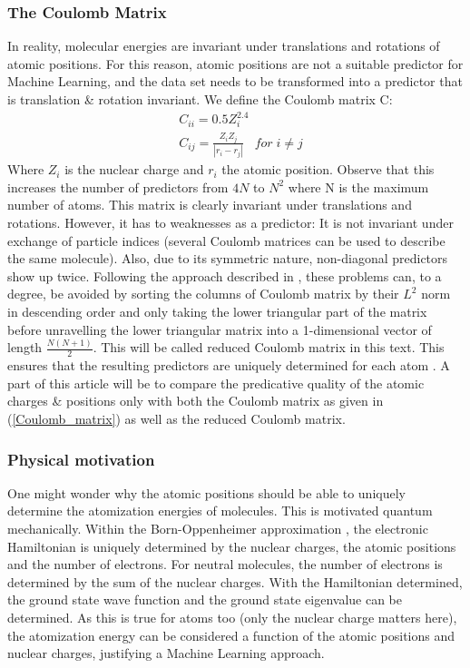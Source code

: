 \documentclass[11pt,a4paper,notitlepage]{article}
\begin{document}
\subsubsection{The Coulomb Matrix}
In reality, molecular energies are invariant under translations and rotations of atomic positions. For this reason, atomic positions are not a suitable predictor for Machine Learning, and the data set needs to be transformed into a predictor that is translation \& rotation invariant. We define the Coulomb matrix C:
\begin{equation}\label{Coulomb_matrix}
\begin{split}
    & C_{ii}=0.5Z_i^{2.4}\\
    & C_{ij}=\frac{Z_iZ_j}{|r_i-r_j|}\;\;\; for\; i\neq j
\end{split}
\end{equation}
Where $Z_i$ is the nuclear charge and $r_i$ the atomic position. Observe that this increases the number of predictors from $4N$ to $N^2$ where N is the maximum number of atoms. This matrix is clearly invariant under translations and rotations. However, it has to weaknesses as a predictor: It is not invariant under exchange of particle indices (several Coulomb matrices can be used to describe the same molecule). Also, due to its symmetric nature, non-diagonal predictors show up twice. Following the approach described in \citep{Atomization_network}, these problems can, to a degree, be avoided by sorting the columns of Coulomb matrix by their $L^2$ norm in descending order and only taking the lower triangular part of the matrix before unravelling the lower triangular matrix into a 1-dimensional vector of length $\frac{N(N+1)}{2}$. This will be called reduced Coulomb matrix in this text. This ensures that the resulting predictors are uniquely determined for each atom \citep{Atomization_Ridge}. A part of this article will be to compare the predicative quality of the atomic charges \& positions only with both the Coulomb matrix as given in (\ref{Coulomb_matrix}) as well as the reduced Coulomb matrix.
\subsubsection{Physical motivation}
One might wonder why the atomic positions should be able to uniquely determine the atomization energies of molecules. This is motivated quantum mechanically. Within the Born-Oppenheimer approximation \citep{szabo}, the electronic Hamiltonian is uniquely determined by the nuclear charges, the atomic positions and the number of electrons. For neutral molecules, the number of electrons is determined by the sum of the nuclear charges. With the Hamiltonian determined, the ground state wave function and the ground state eigenvalue can be determined. As this is true for atoms too (only the nuclear charge matters here), the atomization energy can be considered a function of the atomic positions and nuclear charges, justifying a Machine Learning approach.
\end{document}
